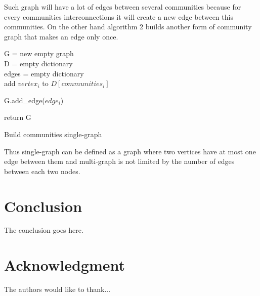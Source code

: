 \documentclass[conference]{IEEEtran}
\begin{document}
	Such graph will have a lot of edges between several communities because for every communities interconnections it will create a new edge between this communities. On the other hand algorithm 2 builds another form of community graph that makes an edge only once.
	
		\begin{algorithm}
			G = new empty graph\\
			D = empty dictionary\\
			edges = empty dictionary\\
			
			 {
				add $vertex_i$ to $D[communities_i ]$\\
			}
			
			
			 {
				G.add\_edge($edge_i$)
			}
			
			return G
			\caption{Build communities single-graph}
		\end{algorithm}
		
	Thus single-graph can be defined as a graph where two vertices have at most one edge between them and multi-graph is not limited by the number of edges between each two nodes. 

\section{Conclusion}
	The conclusion goes here.

\section*{Acknowledgment}
	The authors would like to thank...



\end{document}

